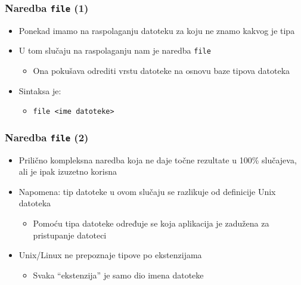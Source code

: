 \documentclass{beamer}
\newcommand{\shell}[1]{\texttt{\small #1}}
\begin{document}
\begin{frame}[t]
\frametitle{Naredba \shell{file} (1)}
\begin{itemize}
  \item Ponekad imamo na raspolaganju datoteku za koju ne znamo kakvog je
        tipa
  \item U tom slučaju na raspolaganju nam je naredba \shell{file}
  \begin{itemize}
    \item Ona pokušava odrediti vrstu datoteke na osnovu baze tipova
          datoteka
  \end{itemize}
  \item Sintaksa je:
  \begin{itemize}
    \item[] \shell{file <ime datoteke>}
    \end{itemize}
\end{itemize}
\end{frame}

\begin{frame}[t]
\frametitle{Naredba \shell{file} (2)}
\begin{itemize}
  \item Prilično kompleksna naredba koja ne daje točne rezultate u 100\%
        slučajeva, ali je ipak izuzetno korisna
  \item Napomena: tip datoteke u ovom slučaju se razlikuje od definicije
        Unix datoteka
  \begin{itemize}
    \item Pomoću tipa datoteke određuje se koja aplikacija je zadužena za
          pristupanje datoteci
  \end{itemize}
  \item Unix/Linux ne prepoznaje tipove po ekstenzijama
  \begin{itemize}
    \item Svaka ``ekstenzija'' je samo dio imena datoteke
  \end{itemize}
\end{itemize}
\end{frame}
\end{document}
